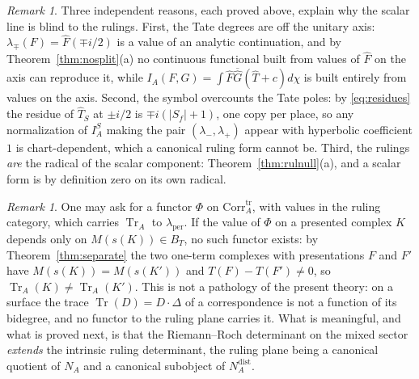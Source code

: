 \documentclass[11pt]{amsart}
\theoremstyle{definition}
\theoremstyle{remark}
\newtheorem{remark}[theorem]{Remark}
\newcommand{\Tr}{\operatorname{Tr}}
\newcommand{\Th}{\widehat{T}}
\newcommand{\Corrtr}{\mathrm{Corr}^{\mathrm{tr}}_{A}}
\newcommand{\BT}{B_T}
\newcommand{\NAd}{N_A^{\mathrm{dist}}}
\begin{document}
\begin{remark}\label{rem:whyblind}
Three independent reasons, each proved above, explain why the scalar line is
blind to the rulings.  First, the Tate degrees are off the unitary axis:
$\lambda_{\mp}(F)=\widehat F(\mp i/2)$ is a value of an analytic continuation,
and by Theorem~\ref{thm:nosplit}(a) no continuous functional built from values
of $\widehat F$ on the axis can reproduce it, while $I_A(F,G)=\int\widehat
F\overline{\widehat G}(\Th+c)d\chi$ is built entirely from values on the axis.
Second, the symbol overcounts the Tate poles: by \eqref{eq:residues} the residue
of $\Th_S$ at $\pm i/2$ is $\mp i(|S_f|+1)$, one copy per place, so any
normalization of $I_A^{S}$ making the pair $(\lambda_-,\lambda_+)$ appear with
hyperbolic coefficient $1$ is chart-dependent, which a canonical ruling form
cannot be.  Third, the rulings \emph{are} the radical of the scalar component:
Theorem~\ref{thm:rulnull}(a), and a scalar form is by definition zero on its own
radical.
\end{remark}

\begin{remark}\label{rem:notafunctor}
One may ask for a functor $\Phi$ on $\Corrtr$, with values in the ruling
category, which carries $\Tr_A$ to $\lambda_{\mathrm{per}}$.  If the value of
$\Phi$ on a presented complex $K$ depends only on $M(s(K))\in\BT$, no such
functor exists: by Theorem~\ref{thm:separate} the two one-term complexes with
presentations $F$ and $F'$ have $M(s(K))=M(s(K'))$ and
$T(F)-T(F')\ne0$, so $\Tr_A(K)\ne\Tr_A(K')$.  This is not a pathology of the
present theory: on a surface the trace $\Tr(D)=D\cdot\Delta$ of a
correspondence is not a function of its bidegree, and no functor to the ruling
plane carries it.  What is meaningful, and what is proved next, is that the
Riemann--Roch determinant on the mixed sector \emph{extends} the intrinsic
ruling determinant, the ruling plane being a canonical quotient of $N_A$ and a
canonical subobject of $\NAd$.
\end{remark}
\end{document}

